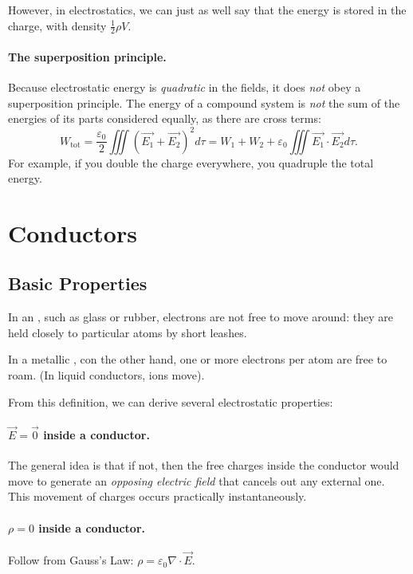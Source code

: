However, in electrostatics, we can just as well say that the energy is stored in the charge, with density $\frac{1}{2}\rho V$.

\paragraph{The superposition principle.} Because electrostatic energy is \textit{quadratic} in the fields, it does \textit{not} obey a superposition principle. The energy of a compound system is \textit{not} the sum of the energies of its parts considered equally, as there are cross terms:
\[W_{\text{tot}}=\frac{\varepsilon_0}2\iiint (\vec{E_1}+\vec{E_2})^2d\tau=W_1+W_2+\varepsilon_0\iiint \vec{E_1}\cdot\vec{E_2}d\tau.\]
For example, if you double the charge everywhere, you quadruple the total energy.

\section{Conductors}

\subsection{Basic Properties}

\begin{definition}
In an , such as glass or rubber, electrons are not free to move around: they are held closely to particular atoms by short leashes. 
\end{definition}

\begin{definition}
In a metallic , con the other hand, one or more electrons per atom are free to roam. (In liquid conductors, ions move).
\end{definition}

From this definition, we can derive several electrostatic properties:

\paragraph{$\vec{E}=\vec{0}$ inside a conductor.} The general idea is that if not, then the free charges inside the conductor would move to generate an \textit{opposing electric field} that cancels out any external one. This movement of charges occurs practically instantaneously.

\paragraph{$\rho=0$ inside a conductor.} Follow from Gauss's Law: $\rho=\varepsilon_0\nabla\cdot \vec{E}$.

